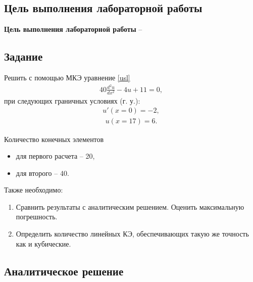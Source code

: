 \subsection{Цель выполнения лабораторной работы}\label{blockN.VariantM}
\textbf{Цель выполнения лабораторной работы }-- \GoalOfResearch

\subsection{Задание}

Решить с помощью МКЭ уравнение \ref{usl}
\begin{align}\label{usl}
40\frac{d^2u}{dx^2}    -4u     +11 
=0,
\end{align}
при следующих граничных условиях (г. у.): 
\begin{align}\label{2_rod}
    u'(x=0) = -2,
\end{align}
\begin{align}\label{1_rod}
    u(x=17) = 6.
\end{align}

Количество конечных элементов
\begin{itemize}
    \item для первого расчета -- 20,
    \item для второго -- 40.
\end{itemize}

Также необходимо:
\begin{enumerate}
    \item Сравнить результаты с аналитическим решением. Оценить максимальную погрешность.
    \item Определить количество линейных КЭ, обеспечивающих такую же точность как и кубические.
\end{enumerate}

\newpage
\subsection{Аналитическое решение}

